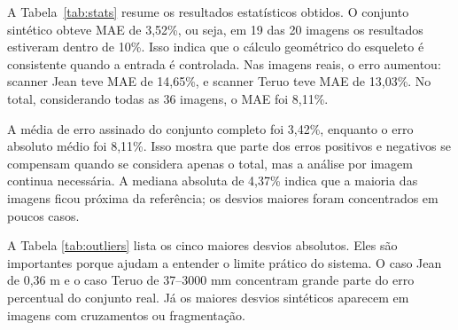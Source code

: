 \documentclass[12pt]{article}
\begin{document}
A Tabela~\ref{tab:stats} resume os resultados estatísticos obtidos. O conjunto sintético obteve MAE de 3,52\%, ou seja, em 19 das 20 imagens os resultados estiveram dentro de 10\%. Isso indica que o cálculo geométrico do esqueleto é consistente quando a entrada é controlada. Nas imagens reais, o erro aumentou: scanner Jean teve MAE de 14,65\%, e scanner Teruo teve MAE de 13,03\%. No total, considerando todas as 36 imagens, o MAE foi 8,11\%.

\begin{table}[!htbp]
\centering
\caption{Estatísticas finais por grupo.}
\label{tab:stats}
\end{table}

A média de erro assinado do conjunto completo foi 3,42\%, enquanto o erro absoluto médio foi 8,11\%. Isso mostra que parte dos erros positivos e negativos se compensam quando se considera apenas o total, mas a análise por imagem continua necessária. A mediana absoluta de 4,37\% indica que a maioria das imagens ficou próxima da referência; os desvios maiores foram concentrados em poucos casos.

A Tabela \ref{tab:outliers} lista os cinco maiores desvios absolutos. Eles são importantes porque ajudam a entender o limite prático do sistema. O caso Jean de 0,36 m e o caso Teruo de 37--3000 mm concentram grande parte do erro percentual do conjunto real. Já os maiores desvios sintéticos aparecem em imagens com cruzamentos ou fragmentação.

\vspace{5mm}

\begin{table}[!htbp]
\centering
\caption{Cinco maiores desvios absolutos da validação final.}
\label{tab:outliers}
\end{table}
\end{document}
